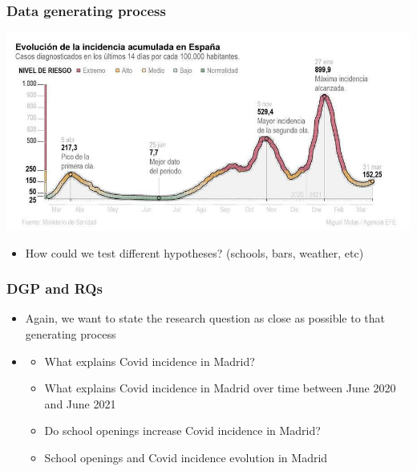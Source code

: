 \documentclass[aspectratio=43]{beamer}
\begin{document}
\begin{frame}
\frametitle{Data generating process}
\centering

\includegraphics[width = \textwidth]{../img/acumuladaincidencia31marzo}

\begin{itemize}[<+->]
  \item How could we test different hypotheses? (schools, bars, weather, etc)
\end{itemize}

\end{frame}

\begin{frame}
\frametitle{DGP and RQs}
\centering

\begin{itemize}
  \item Again, we want to state the research question as close as possible to that generating process
  \item[]
  \begin{itemize}
    \item What explains Covid incidence in Madrid?
    \item What explains Covid incidence in Madrid over time between June 2020 and June 2021
    \item Do school openings increase Covid incidence in Madrid?
    \item School openings and Covid incidence evolution in Madrid
  \end{itemize}
\end{itemize}

\end{frame}
\end{document}
